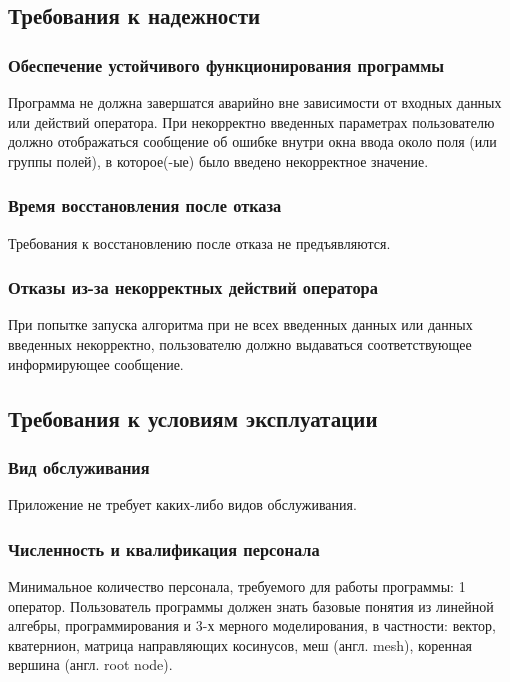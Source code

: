 \subsection{Требования к надежности}
\subsubsection{Обеспечение устойчивого функционирования программы}
Программа не должна завершатся аварийно вне зависимости от входных данных или действий оператора. При некорректно введенных параметрах пользователю должно отображаться сообщение об ошибке внутри окна ввода около поля (или группы полей), в которое(-ые) было введено некорректное значение.
\subsubsection{Время восстановления после отказа}
Требования к восстановлению после отказа не предъявляются.
\subsubsection{Отказы из-за некорректных действий оператора}
При попытке запуска алгоритма при не всех введенных данных или данных введенных некорректно, пользователю должно выдаваться соответствующее информирующее сообщение.


\subsection{Требования к условиям эксплуатации}
\subsubsection{Вид обслуживания}
Приложение не требует каких-либо видов обслуживания.
\subsubsection{Численность и квалификация персонала}
Минимальное количество персонала, требуемого для работы программы: 1 оператор. Пользователь программы должен знать базовые понятия из линейной алгебры, программирования и 3-х мерного моделирования, в частности: вектор, кватернион, матрица направляющих косинусов, меш (англ. mesh), коренная вершина (англ. root node).


